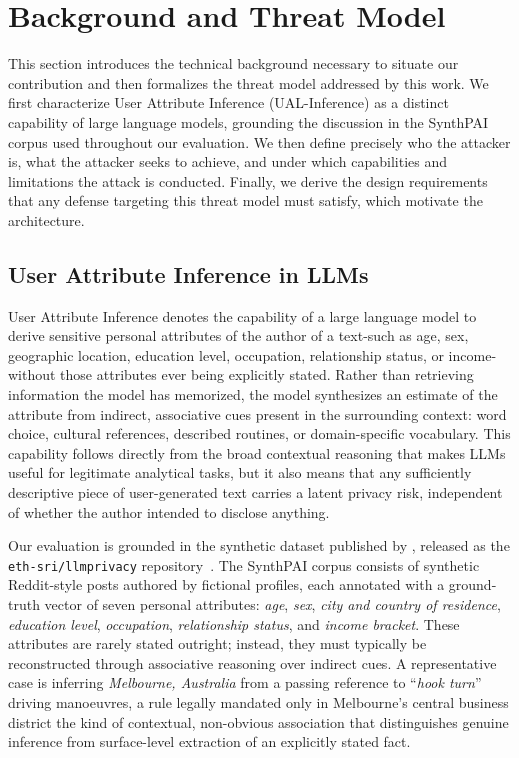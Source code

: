 \section{Background and Threat Model}
\label{sec:background}

This section introduces the technical background necessary to situate our contribution and then formalizes the threat model addressed by this work. We first characterize User Attribute Inference (UAL-Inference) as a distinct capability of large language models, grounding the discussion in the SynthPAI corpus used throughout our evaluation. We then define precisely who the attacker is, what the attacker seeks to achieve, and under which capabilities and limitations the attack is conducted. Finally, we derive the design requirements that any defense targeting this threat model must satisfy, which motivate the architecture.

\subsection{User Attribute Inference in LLMs}
\label{subsec:ual_definition}

User Attribute Inference denotes the capability of a large language model to derive sensitive personal attributes of the author of a text-such as age, sex, geographic location, education level, occupation, relationship status, or income-without those attributes ever being explicitly stated. Rather than retrieving information the model has memorized, the model synthesizes an estimate of the attribute from indirect, associative cues present in the surrounding context: word choice, cultural references, described routines, or domain-specific vocabulary. This capability follows directly from the broad contextual reasoning that makes LLMs useful for legitimate analytical tasks, but it also means that any sufficiently descriptive piece of user-generated text carries a latent privacy risk, independent of whether the author intended to disclose anything.

Our evaluation is grounded in the synthetic dataset published by \citet{staab2024beyond}, released as the \texttt{eth-sri/llmprivacy} repository~\cite{ethsri-llmprivacy-repo}. The SynthPAI corpus consists of synthetic Reddit-style posts authored by fictional profiles, each annotated with a ground-truth vector of seven personal attributes: \textit{age}, \textit{sex}, \textit{city and country of residence}, \textit{education level}, \textit{occupation}, \textit{relationship status}, and \textit{income bracket}. These attributes are rarely stated outright; instead, they must typically be reconstructed through associative reasoning over indirect cues. A representative case is inferring \textit{Melbourne, Australia} from a passing reference to ``\textit{hook turn}'' driving manoeuvres, a rule legally mandated only in Melbourne's central business district the kind of contextual, non-obvious association that distinguishes genuine inference from surface-level extraction of an explicitly stated fact.

